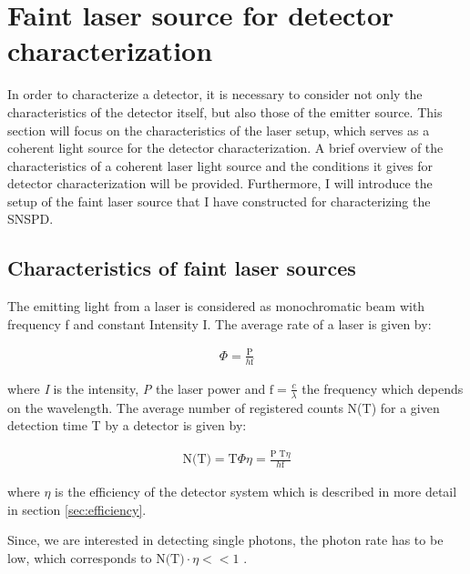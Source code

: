 
\chapter{Faint laser source for detector characterization}
\label{sec:SNSPD_setup}

In order to characterize a detector, it is necessary to consider not only the characteristics of the detector itself,
but also those of the emitter source.
This section will focus on the characteristics of the laser setup, which serves as a coherent light source for the detector
characterization.
A brief overview of the characteristics of a coherent laser light source and the conditions it gives
for detector characterization will be provided.
Furthermore, I will introduce the setup of the faint laser source that I have constructed for characterizing the SNSPD.

\section{Characteristics of faint laser sources}\label{sec:characteristics_faint laser sources}


The emitting light from a laser is considered as monochromatic beam with frequency f
and constant Intensity I. The average rate of a laser is given by:

\begin{align}
    \Phi = \frac{\text{P}}{h \text{f}}
\end{align}

where \textit{I} is the intensity, \textit{P} the laser power and $\text{f} = \frac{c}{\lambda}$ the frequency which
depends on the wavelength.
The average number of registered counts N(T) for a given detection time T by a detector is given by:

\begin{align}
    \text{N(T)} = \text{T} \Phi \eta= \frac{\text{P T} \eta}{h \text{f}}
\end{align}

where \textit{$\eta$} is the efficiency of the detector system which is described in more detail in section \ref{sec:efficiency}.

Since, we are interested in detecting single photons, the photon rate has to be low, which corresponds to
$\text{N(T)} \cdot \eta << 1$ \cite{hadfield-2009}.

